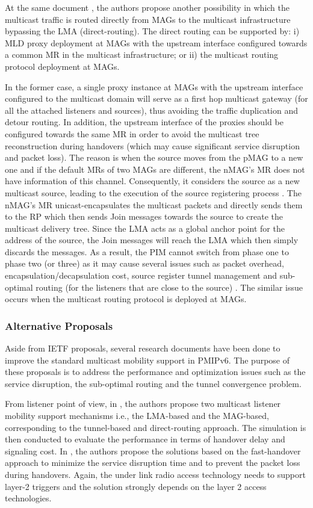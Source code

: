 At the same document \cite{multicast_source}, the authors propose another possibility in which the multicast traffic is routed directly from MAGs to the multicast infrastructure bypassing the LMA (direct-routing). The direct routing can be supported by: i) MLD proxy deployment at MAGs with the upstream interface configured towards a common MR in the multicast infrastructure; or ii) the multicast routing protocol deployment at MAGs.  

In the former case, a single proxy instance at MAGs with the upstream interface configured to the multicast domain will serve as a first hop multicast gateway (for all the attached listeners and sources), thus avoiding the traffic duplication and detour routing. In addition, the upstream interface of the proxies should be configured towards the same MR in order to avoid the multicast tree reconstruction during handovers (which may cause significant service disruption and packet loss). The reason is when the source moves from the pMAG to a new one and if the default MRs of two MAGs are different, the nMAG's MR does not have information of this channel. Consequently, it considers the source as a new multicast source, leading to the execution of the source registering process \cite{multicast_source}. The nMAG's MR unicast-encapsulates the multicast packets and directly sends them to the RP which then sends Join messages towards the source to create the multicast delivery tree. Since the LMA acts as a global anchor point for the address of the source, the Join messages will reach the LMA which then simply discards the messages. As a result, the PIM cannot switch from phase one to phase two (or three) as it may cause several issues such as packet overhead, encapsulation/decapsulation cost, source register tunnel management and sub-optimal routing (for the listeners that are close to the source) \cite{PIM_SM}. The similar issue occurs when the multicast routing protocol is deployed at MAGs.
\subsubsection{Alternative Proposals}
Aside from IETF proposals, several research documents have been done to improve the standard multicast mobility support in PMIPv6. The purpose of these proposals is to address the performance and optimization issues such as the service disruption, the sub-optimal routing and the tunnel convergence problem. 

From listener point of view, in \cite{PMIP_listener_Li}, the authors propose two multicast listener mobility support mechanisms i.e., the LMA-based and the MAG-based, corresponding to the tunnel-based and direct-routing approach. The simulation is then conducted to evaluate the performance in terms of handover delay and signaling cost. In \cite{PMIP_multicast_fast_HO_Gohar, PMIP_multicast_fast_HO_Lee}, the authors propose the solutions based on the fast-handover approach to minimize the service disruption time and to prevent the packet loss during handovers. Again, the under link radio access technology needs to support layer-2 triggers and the solution strongly depends on the layer 2 access technologies. 

